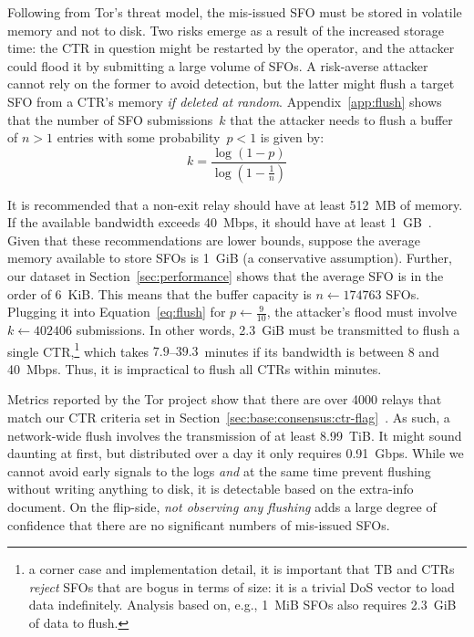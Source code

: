 Following from Tor's threat model, the mis-issued SFO must be stored in
volatile memory and not to disk.  Two risks emerge as a result of the increased
storage time:
	the CTR in question might be restarted by the operator,
	and the attacker could flood it by submitting a large volume of SFOs.
A risk-averse attacker cannot rely on the former to avoid detection, but the
latter might flush a target SFO from a CTR's memory \emph{if deleted at random}.
Appendix~\ref{app:flush} shows that the number of SFO submissions~$k$ that the
attacker needs to flush a buffer of $n>1$ entries with some probability~$p<1$ is
given by:
\begin{equation} \label{eq:flush}
	k = \frac{\log(1-p)}{\log(1 - \frac{1}{n})}
\end{equation}

It is recommended that a non-exit relay should have at least 512~MB of memory.
If the available bandwidth exceeds 40~Mbps, it should have at least
1~GB~\cite{relay-config}.  Given that these recommendations are lower bounds,
suppose the average memory available to store SFOs is 1~GiB (a conservative
assumption).  Further, our dataset in Section~\ref{sec:performance} shows that
the average SFO is in the order of 6~KiB.  This means that the buffer capacity
is $n \gets 174763$ SFOs. Plugging it into Equation~\ref{eq:flush} for $p \gets
\frac{9}{10}$, the attacker's flood must involve $k \gets 402406$ submissions.
In other words, 2.3~GiB must be transmitted to flush a single CTR,\footnote{%
a corner case and implementation detail, it is important that TB and
CTRs \emph{reject} SFOs that are bogus in terms of size: it is a trivial DoS
vector to load data indefinitely. Analysis based on, e.g., 1~MiB SFOs also
requires 2.3~GiB of data to flush.} which takes $7.9$--$39.3$~minutes if its
bandwidth is between 8 and 40~Mbps. Thus, it is impractical to flush all CTRs
within minutes.

Metrics reported by the Tor project show that there are over 4000 relays that
match our CTR criteria set in
Section~\ref{sec:base:consensus:ctr-flag}~\cite{relay-by-flag}.  As such, a
network-wide flush involves the transmission of at least 8.99~TiB.  It might
sound daunting at first, but distributed over a day it only requires 0.91~Gbps.
While we cannot avoid early signals to the logs \emph{and} at the same time
prevent flushing without writing anything to disk, it is detectable based on the
extra-info document.  On the flip-side, \emph{not observing any flushing} adds a
large degree of confidence that there are no significant numbers of mis-issued
SFOs.

